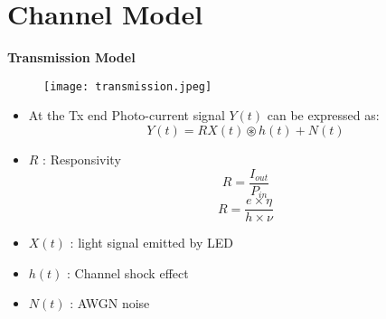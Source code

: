 \documentclass[9pt, dvipsnames]{beamer} %
\begin{document}
\section{Channel Model}
 
   \begin{frame}{\textbf {Transmission Model}}
          
             \begin{figure}
               \texttt{[image: transmission.jpeg]}
             \end{figure}
             \begin{itemize}
             \item At the Tx end Photo-current signal $Y(t)$ can be expressed as:
             \begin{equation}
                 Y(t)=RX(t)\circledast h(t)+N(t)
             \end{equation}
              \item $R$ : Responsivity 
              \begin{equation}
                  R=\frac{I_{out}}{P_{in}}
              \end{equation}
              \begin{equation}
                  R=\frac{e\times \eta}{h\times \nu}
              \end{equation}
              \item $X(t)$ : light signal emitted by LED
              \item $h(t)$ : Channel shock effect
              \item $N(t)$ : AWGN noise
             \end{itemize}
          
   \end{frame}
   
\end{document}
